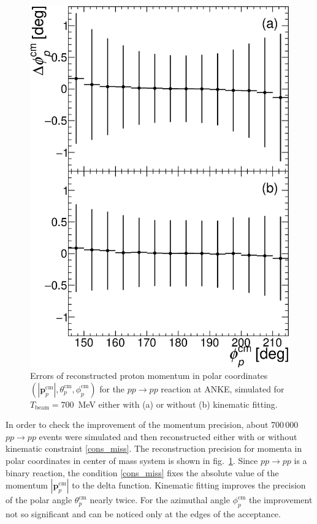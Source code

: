 \begin{figure}[htbp]
\includegraphics[height=0.3\textheight]{pics/drawPhi.eps}
\caption{
Errors of reconstructed proton momentum in polar coordinates $(|\boldsymbol{p}_p^\mathrm{cm}|, \theta_p^\mathrm{cm}, \phi_p^\mathrm{cm})$ for the $pp \to pp$ reaction at ANKE, simulated for $T_\mathrm{beam} = 700$~MeV either with (a) or without (b) kinematic fitting.
}
\label{anke_errs}
\end{figure}

In order to check the improvement of the momentum precision, about 700\,000 $pp \to pp$ events were simulated and then reconstructed either with or without kinematic constraint \eqref{cons_miss}.
The reconstruction precision for momenta in polar coordinates in center of mass system is shown in fig.~\ref{anke_errs}.
Since $pp \to pp$ is a binary reaction, the condition \eqref{cons_miss} fixes the absolute value of the momentum $|\boldsymbol{p}_p^\mathrm{cm}|$ to the delta function.
Kinematic fitting improves the precision of the polar angle $\theta_p^\mathrm{cm}$ nearly twice.
For the azimuthal angle $\phi_p^\mathrm{cm}$ the improvement not so significant and can be noticed only at the edges of the acceptance.
